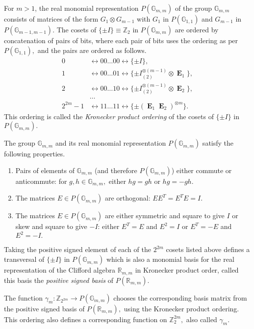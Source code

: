 \documentclass[12pt,a4paper]{article}
\newcommand{\mb}[1]{\mathbb{#1}}
\newcommand{\mf}[1]{\mathbf{#1}}
\newcommand{\oE}{\mf{\operatorname{E}}}
\newcommand{\G}{\mb{G}}
\newcommand{\R}{\mb{R}}
\newcommand{\Z}{\mb{Z}}
\newcommand{\Rep}{P}
\newcommand{\To}{\rightarrow}
\newtheorem{Definition}{Definition}
\begin{document}
For $m > 1$,
the real monomial representation $\Rep(\G_{m,m})$ of the 
group $\G_{m,m}$ consists of matrices of the form $G_1 \otimes G_{m-1}$
with $G_1$ in $\Rep(\G_{1,1})$ and $G_{m-1}$ in $\Rep(\G_{m-1,m-1}).$
The cosets of $\{\pm I\} \equiv \Z_2$ in $\Rep(\G_{m,m})$ are
ordered by concatenation of pairs of bits, 
where each pair of bits uses the ordering as per $\Rep(\G_{1,1}),$
and the pairs are ordered as follows.
\begin{align*}
0 &\leftrightarrow 00 \ldots 00 \leftrightarrow \{ \pm I \},
\\
1 &\leftrightarrow 00 \ldots 01 \leftrightarrow \{ \pm I_{(2)}^{\otimes {(m-1)}} \otimes  \oE_1 \},
\\
2 &\leftrightarrow 00 \ldots 10 \leftrightarrow \{ \pm I_{(2)}^{\otimes {(m-1)}} \otimes  \oE_2 \},
\\
&\ldots
\\
2^{2m} - 1 &\leftrightarrow 11 \ldots 11 \leftrightarrow \{ \pm (\oE_1 \oE_2)^{\otimes {m}} \}.
\end{align*}
This ordering is called 
the \emph{Kronecker product ordering} of the cosets of $\{\pm I\}$ in $\Rep(\G_{m,m}).$

The group $\G_{m,m}$ and its real monomial representation $\Rep(\G_{m,m})$ 
satisfy the following properties.
\begin{enumerate}
\item 
Pairs of elements of $\G_{m,m}$ (and therefore $\Rep(\G_{m,m})$) either commute or anti\-commute:
for $g, h \in \G_{m,m},$ either $h g = g h$ or $h g = - g h.$
\item
The matrices $E \in \Rep(\G_{m,m})$ are orthogonal: $E E^T = E^T E = I.$
\item
The matrices $E \in \Rep(\G_{m,m})$ are either symmetric and square to give $I$ or 
skew and square to give $-I$: either $E^T = E$ and $E^2 =I$ or $E^T = -E$ and $E^2 = -I.$
\end{enumerate}

Taking the positive signed element of each of the $2^{2m}$ cosets listed above
defines a transversal of $\{\pm I\}$ in $\Rep(\G_{m,m})$
which is also a monomial basis for the real representation of the Clifford algebra $\R_{m,m}$ in 
Kronecker product order,
called this basis the \emph{positive signed basis} of $\Rep(\R_{m,m}).$ 

The function $\gamma_m : \Z_{2^{2 m}} \To \Rep(\G_{m,m})$ 
chooses the corresponding basis matrix from the positive signed basis of $\Rep(\R_{m,m}),$
using the Kronecker product ordering.
This ordering also defines a corresponding function on $\Z_2^{2 m},$
also called $\gamma_m.$
\end{document}
